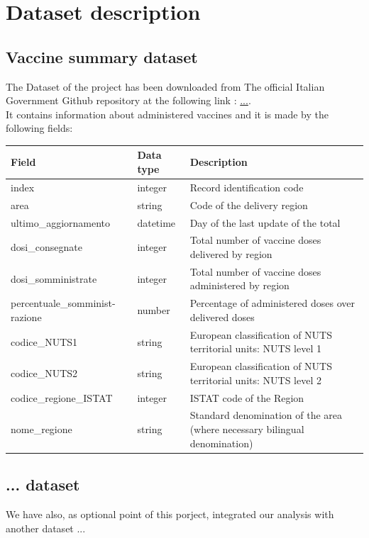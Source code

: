 \documentclass{article}
\begin{document}
\newpage
\section{Dataset description}
\subsection{Vaccine summary dataset}
The Dataset of the project has been downloaded from The official Italian Government Github repository at the following link : \url{...}.
\\
\hfill\break
It contains information about administered vaccines and it is made by the following fields:
\begin{center}
\begin{tabular}{ |m{4cm}|m{2cm}|m{4.5cm}|}
  \hline
  \bfseries{Field} & \bfseries{Data type} & \bfseries{Description} \\
  \hline\hline
  index & integer & Record identification code\\
  \hline
  area & string & Code of the delivery region\\
    \hline
  ultimo\_aggiornamento & datetime & Day of the last update of the total\\ 
    \hline
  dosi\_consegnate & integer & Total number of vaccine doses delivered by region\\
    \hline
  dosi\_somministrate & integer & Total number of vaccine doses administered by region\\ 
    \hline
  percentuale\_somminist-\hfill\break razione & number & Percentage of administered doses over delivered doses\\ 
    \hline
  codice\_NUTS1 & string & European classification of NUTS territorial units: NUTS level 1\\ 
    \hline
  codice\_NUTS2 & string & European classification of NUTS territorial units: NUTS level 2\\ 
    \hline
  codice\_regione\_ISTAT & integer & ISTAT code of the Region\\
    \hline
  nome\_regione & string & Standard denomination of the area (where necessary bilingual denomination)\\ 
  \hline
\end{tabular}
\end{center}

\newpage
\subsection{... dataset}
We have also, as optional point of this porject, integrated our analysis with another dataset ...
\end{document}
